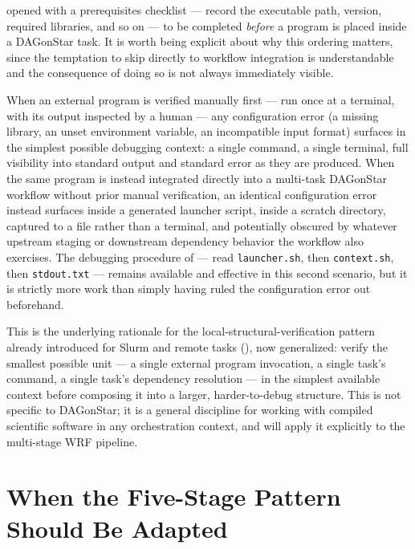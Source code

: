  opened with a prerequisites checklist --- record
the executable path, version, required libraries, and so on --- to be
completed \emph{before} a program is placed inside a DAGonStar task. It is
worth being explicit about why this ordering matters, since the temptation
to skip directly to workflow integration is understandable and the
consequence of doing so is not always immediately visible.

When an external program is verified manually first --- run once at a
terminal, with its output inspected by a human --- any configuration error
(a missing library, an unset environment variable, an incompatible input
format) surfaces in the simplest possible debugging context: a single
command, a single terminal, full visibility into standard output and
standard error as they are produced. When the same program is instead
integrated directly into a multi-task DAGonStar workflow without prior
manual verification, an identical configuration error instead surfaces
inside a generated launcher script, inside a scratch directory, captured to
a file rather than a terminal, and potentially obscured by whatever
upstream staging or downstream dependency behavior the workflow also
exercises. The debugging procedure of  --- read
\texttt{launcher.sh}, then \texttt{context.sh}, then \texttt{stdout.txt} ---
remains available and effective in this second scenario, but it is
strictly more work than simply having ruled the configuration error out
beforehand.

\begin{practicebox}
This is the underlying rationale for the local-structural-verification
pattern already introduced for Slurm and remote tasks
(), now generalized: verify the smallest possible unit ---
a single external program invocation, a single task's command, a single
task's dependency resolution --- in the simplest available context before
composing it into a larger, harder-to-debug structure. This is not specific
to DAGonStar; it is a general discipline for working with compiled
scientific software in any orchestration context, and 
will apply it explicitly to the multi-stage WRF pipeline.
\end{practicebox}

\section{When the Five-Stage Pattern Should Be Adapted}

